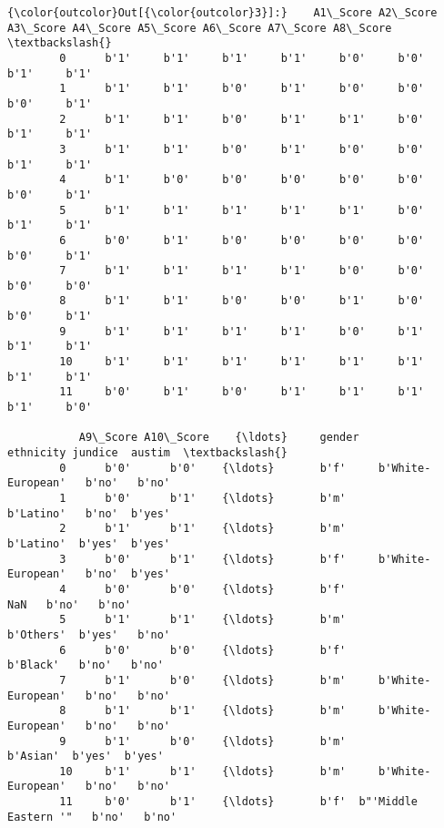 \documentclass[11pt]{article}
\begin{document}
\begin{Verbatim}[commandchars=\\\{\}]
{\color{outcolor}Out[{\color{outcolor}3}]:}    A1\_Score A2\_Score A3\_Score A4\_Score A5\_Score A6\_Score A7\_Score A8\_Score  \textbackslash{}
        0      b'1'     b'1'     b'1'     b'1'     b'0'     b'0'     b'1'     b'1'   
        1      b'1'     b'1'     b'0'     b'1'     b'0'     b'0'     b'0'     b'1'   
        2      b'1'     b'1'     b'0'     b'1'     b'1'     b'0'     b'1'     b'1'   
        3      b'1'     b'1'     b'0'     b'1'     b'0'     b'0'     b'1'     b'1'   
        4      b'1'     b'0'     b'0'     b'0'     b'0'     b'0'     b'0'     b'1'   
        5      b'1'     b'1'     b'1'     b'1'     b'1'     b'0'     b'1'     b'1'   
        6      b'0'     b'1'     b'0'     b'0'     b'0'     b'0'     b'0'     b'1'   
        7      b'1'     b'1'     b'1'     b'1'     b'0'     b'0'     b'0'     b'0'   
        8      b'1'     b'1'     b'0'     b'0'     b'1'     b'0'     b'0'     b'1'   
        9      b'1'     b'1'     b'1'     b'1'     b'0'     b'1'     b'1'     b'1'   
        10     b'1'     b'1'     b'1'     b'1'     b'1'     b'1'     b'1'     b'1'   
        11     b'0'     b'1'     b'0'     b'1'     b'1'     b'1'     b'1'     b'0'   
        
           A9\_Score A10\_Score    {\ldots}     gender             ethnicity jundice  austim  \textbackslash{}
        0      b'0'      b'0'    {\ldots}       b'f'     b'White-European'   b'no'   b'no'   
        1      b'0'      b'1'    {\ldots}       b'm'             b'Latino'   b'no'  b'yes'   
        2      b'1'      b'1'    {\ldots}       b'm'             b'Latino'  b'yes'  b'yes'   
        3      b'0'      b'1'    {\ldots}       b'f'     b'White-European'   b'no'  b'yes'   
        4      b'0'      b'0'    {\ldots}       b'f'                   NaN   b'no'   b'no'   
        5      b'1'      b'1'    {\ldots}       b'm'             b'Others'  b'yes'   b'no'   
        6      b'0'      b'0'    {\ldots}       b'f'              b'Black'   b'no'   b'no'   
        7      b'1'      b'0'    {\ldots}       b'm'     b'White-European'   b'no'   b'no'   
        8      b'1'      b'1'    {\ldots}       b'm'     b'White-European'   b'no'   b'no'   
        9      b'1'      b'0'    {\ldots}       b'm'              b'Asian'  b'yes'  b'yes'   
        10     b'1'      b'1'    {\ldots}       b'm'     b'White-European'   b'no'   b'no'   
        11     b'0'      b'1'    {\ldots}       b'f'  b"'Middle Eastern '"   b'no'   b'no'   
        

\end{Verbatim}
\end{document}
